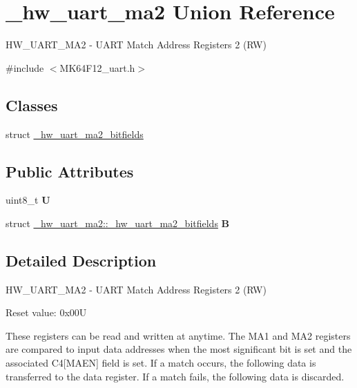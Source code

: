 \hypertarget{union__hw__uart__ma2}{}\section{\+\_\+hw\+\_\+uart\+\_\+ma2 Union Reference}
\label{union__hw__uart__ma2}


H\+W\+\_\+\+U\+A\+R\+T\+\_\+\+M\+A2 -\/ U\+A\+RT Match Address Registers 2 (RW)  




{\ttfamily \#include $<$M\+K64\+F12\+\_\+uart.\+h$>$}

\subsection*{Classes}
\begin{DoxyCompactItemize}
\item 
struct \hyperlink{struct__hw__uart__ma2_1_1__hw__uart__ma2__bitfields}{\+\_\+hw\+\_\+uart\+\_\+ma2\+\_\+bitfields}
\end{DoxyCompactItemize}
\subsection*{Public Attributes}
\begin{DoxyCompactItemize}
\item 
uint8\+\_\+t {\bfseries U}\hypertarget{union__hw__uart__ma2_a1f2211e4db4084d3d6c25ecb2cfa0418}{}\label{union__hw__uart__ma2_a1f2211e4db4084d3d6c25ecb2cfa0418}

\item 
struct \hyperlink{struct__hw__uart__ma2_1_1__hw__uart__ma2__bitfields}{\+\_\+hw\+\_\+uart\+\_\+ma2\+::\+\_\+hw\+\_\+uart\+\_\+ma2\+\_\+bitfields} {\bfseries B}\hypertarget{union__hw__uart__ma2_adbbb96380bea37263441c08e9e23aefa}{}\label{union__hw__uart__ma2_adbbb96380bea37263441c08e9e23aefa}

\end{DoxyCompactItemize}


\subsection{Detailed Description}
H\+W\+\_\+\+U\+A\+R\+T\+\_\+\+M\+A2 -\/ U\+A\+RT Match Address Registers 2 (RW) 

Reset value\+: 0x00U

These registers can be read and written at anytime. The M\+A1 and M\+A2 registers are compared to input data addresses when the most significant bit is set and the associated C4\mbox{[}M\+A\+EN\mbox{]} field is set. If a match occurs, the following data is transferred to the data register. If a match fails, the following data is discarded. 

